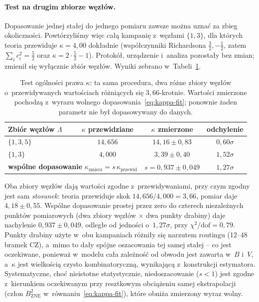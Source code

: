 \documentclass[11pt]{article}
\begin{document}
\paragraph{Test na drugim zbiorze węzłów.} Dopasowanie jednej stałej do jednego pomiaru zawsze można
uznać za zbieg okoliczności. Powtórzyliśmy więc całą kampanię z~węzłami $\{1,3\}$, dla których
teoria przewiduje $\kappa = 4{,}00$ dokładnie (współczynniki Richardsona $\tfrac{3}{2},
-\tfrac{1}{2}$, zatem $\sum_i c_i^2 = \tfrac{5}{2}$ oraz $\kappa = 2\cdot\tfrac{5}{2}-1$).
Protokół, urządzenie i~analiza pozostały bez zmian; zmienił się wyłącznie zbiór węzłów. Wyniki
zebrano w~Tabeli~\ref{tab:kappa2}.

\begin{table}[!ht]\centering
\caption{Test ogólności prawa $\kappa$: ta sama procedura, dwa różne zbiory węzłów o~przewidywanych
wartościach różniących się $3{,}66$-krotnie. Wartości zmierzone pochodzą z~wyrazu wolnego
dopasowania~\eqref{eq:kappa-fit}; ponownie żaden parametr nie był dopasowywany do danych.}
\label{tab:kappa2}
\begin{tabular}{lccc}
\toprule
Zbiór węzłów $\Lambda$ & $\kappa$ przewidziane & $\kappa$ zmierzone & odchylenie \\
\midrule
$\{1,3,5\}$ & $14{,}656$ & $14{,}16 \pm 0{,}83$ & $0{,}60\sigma$ \\
$\{1,3\}$   & $4{,}000$  & $3{,}39 \pm 0{,}40$  & $1{,}52\sigma$ \\
\midrule
\multicolumn{2}{l}{\textbf{wspólne dopasowanie} $\kappa_{\text{zmierz}} = s\,\kappa_{\text{przewid}}$}
 & $s = 0{,}937 \pm 0{,}049$ & $1{,}27\sigma$ \\
\bottomrule
\end{tabular}
\end{table}

Oba zbiory węzłów dają wartości zgodne z~przewidywaniami, przy czym zgodny jest sam \emph{stosunek}: teoria przewiduje skok $14{,}656/4{,}000 = 3{,}66$, pomiar daje
$4{,}18 \pm 0{,}55$. Wspólne dopasowanie prostej przez zero do czterech niezależnych punktów
pomiarowych (dwa zbiory węzłów $\times$ dwa punkty drabiny) daje nachylenie $0{,}937 \pm 0{,}049$,
odległe od jedności o~$1{,}27\sigma$, przy $\chi^2/\mathrm{dof} = 0{,}79$. Punkty drabiny użyte w~obu kampaniach różniły się narzutem routingu (12--48 bramek CZ), a~mimo to
dały spójne oszacowania tej samej stałej -- co jest oczekiwane, ponieważ w~modelu cała zależność
od obwodu jest zawarta w~$B$ i~$V$, a~$\kappa$ jest wielkością czysto kombinatoryczną, wynikającą
z~konstrukcji estymatora. Systematyczne, choć nieistotne statystycznie, niedoszacowanie
($s < 1$) jest zgodne z~kierunkiem oczekiwanym przy resztkowym obciążeniu samej ekstrapolacji
(człon $B_{\text{ZNE}}^2$ w~równaniu~\eqref{eq:kappa-fit}), które obniża zmierzony wyraz wolny.
\end{document}
